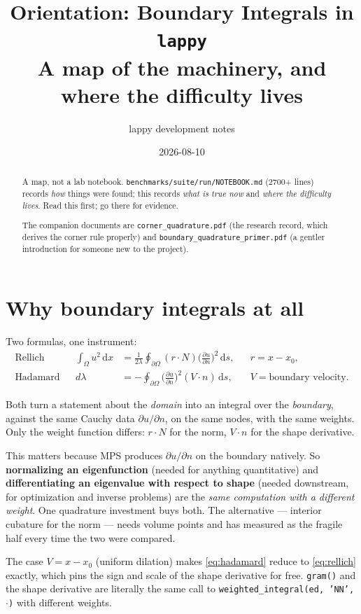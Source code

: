 \documentclass[11pt]{article}
\title{Orientation: Boundary Integrals in \texttt{lappy}\\
\large A map of the machinery, and where the difficulty lives}
\author{lappy development notes}
\date{2026-08-10}
\newcommand{\dd}{\,\mathrm{d}}
\newcommand{\Om}{\Omega}
\newcommand{\code}[1]{\texttt{#1}}
\newcommand{\pdn}[1]{\frac{\partial #1}{\partial n}}
\begin{document}
\sloppy
\maketitle

\begin{abstract}
\noindent
A map, not a lab notebook. \code{benchmarks/suite/run/NOTEBOOK.md} (2700+ lines)
records \emph{how} things were found; this records \emph{what is true now} and
\emph{where the difficulty lives}. Read this first; go there for evidence.

\medskip\noindent
The companion documents are \code{corner\_quadrature.pdf} (the research record,
which derives the corner rule properly) and
\code{boundary\_quadrature\_primer.pdf} (a gentler introduction for someone new
to the project).
\end{abstract}

\section{Why boundary integrals at all}

Two formulas, one instrument:
\begin{align}
  \text{Rellich}  &&  \int_\Om u^2 \dd x &= \frac{1}{2\lambda}
    \oint_{\partial\Om} (r\cdot N)\Big(\pdn{u}\Big)^{\!2} \dd s,
    && r = x - x_0, \label{eq:rellich}\\[2pt]
  \text{Hadamard} &&  d\lambda &= -
    \oint_{\partial\Om} \Big(\pdn{u}\Big)^{\!2} (V\cdot n) \dd s,
    && V = \text{boundary velocity}. \label{eq:hadamard}
\end{align}

Both turn a statement about the \emph{domain} into an integral over the
\emph{boundary}, against the same Cauchy data $\partial u/\partial n$, on the
same nodes, with the same weights. Only the weight function differs: $r\cdot N$
for the norm, $V\cdot n$ for the shape derivative.

This matters because MPS produces $\partial u/\partial n$ on the boundary
natively. So \textbf{normalizing an eigenfunction} (needed for anything
quantitative) and \textbf{differentiating an eigenvalue with respect to shape}
(needed downstream, for optimization and inverse problems) are the \emph{same
computation with a different weight}. One quadrature investment buys both. The
alternative --- interior cubature for the norm --- needs volume points and has
measured as the fragile half every time the two were compared.

The case $V = x - x_0$ (uniform dilation) makes \eqref{eq:hadamard} reduce to
\eqref{eq:rellich} exactly, which pins the sign and scale of the shape
derivative for free. \code{gram()} and the shape derivative are literally the
same call to \code{weighted\_integral(ed, 'NN', $\cdot$)} with different weights.
\end{document}
